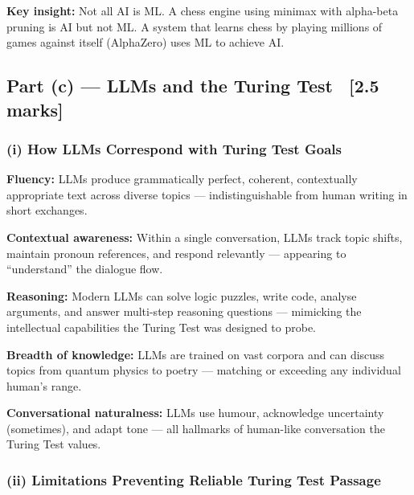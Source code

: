 \documentclass[12pt, a4paper]{article}
\begin{document}
\noindent \textbf{Key insight:} Not all AI is ML. A chess engine using minimax with alpha-beta pruning is AI but not ML. A system that learns chess by playing millions of games against itself (AlphaZero) uses ML to achieve AI.

\subsection{Part (c) — LLMs and the Turing Test \ [2.5 marks]}

\subsubsection*{(i) How LLMs Correspond with Turing Test Goals}

\begin{keypoints}
  \item \textbf{Fluency:} LLMs produce grammatically perfect, coherent, contextually appropriate text across diverse topics — indistinguishable from human writing in short exchanges.
  \item \textbf{Contextual awareness:} Within a single conversation, LLMs track topic shifts, maintain pronoun references, and respond relevantly — appearing to ``understand'' the dialogue flow.
  \item \textbf{Reasoning:} Modern LLMs can solve logic puzzles, write code, analyse arguments, and answer multi-step reasoning questions — mimicking the intellectual capabilities the Turing Test was designed to probe.
  \item \textbf{Breadth of knowledge:} LLMs are trained on vast corpora and can discuss topics from quantum physics to poetry — matching or exceeding any individual human's range.
  \item \textbf{Conversational naturalness:} LLMs use humour, acknowledge uncertainty (sometimes), and adapt tone — all hallmarks of human-like conversation the Turing Test values.
\end{keypoints}

\subsubsection*{(ii) Limitations Preventing Reliable Turing Test Passage}
\end{document}
